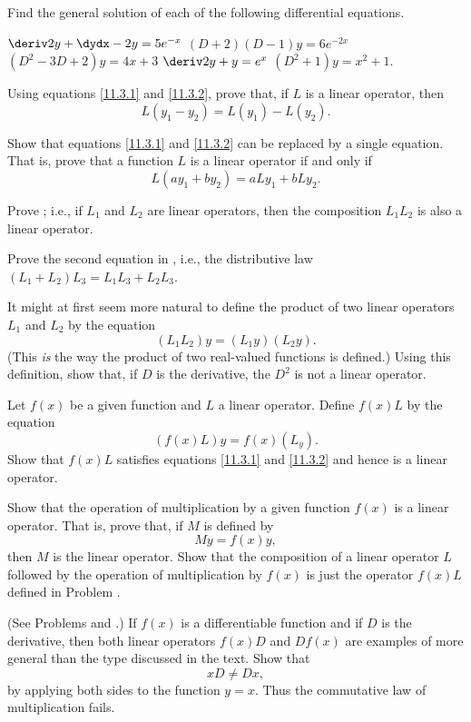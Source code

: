 \begin{exercises}

Find the general solution of each of the following
differential equations.
\begin{exenum}
\x
$\deriv2y + \dydx - 2y = 5{e^{-x}}$
\x
$(D+2)(D-1)y=6e^{-2x}$
\x
$(D^2-3D+2)y = 4x+3$
\x
$\deriv2y + y = e^x$
\x
$(D^2+1)y = x^2+1$.
\end{exenum}

Using equations \eqref{11.3.1} and \eqref{11.3.2},
prove that, if $L$ is a linear operator, then
\[
L(y_1 - y_2) = L(y_1) - L(y_2)
.
\]

Show that equations \eqref{11.3.1} and \eqref{11.3.2}
can be replaced by a single equation.
That is, prove that a function $L$ is a linear
operator if and only if
\[
L(ay_1+by_2) = aLy_1 + bLy_2
.
\]

Prove ; i.e., if $L_1$ and $L_2$
are linear operators, then the composition $L_1L_2$
is also a linear operator.

Prove the second equation in , i.e.,
the distributive law
$(L_1+L_2)L_3 = L_1L_3+L_2L_3$.

It might at first seem more natural to define the product
of two linear operators $L_1$ and $L_2$ by the equation
\[
(L_1L_2)y = (L_1y)(L_2y)
.
\]
(This \emph{is} the way the product of two
real-valued functions is defined.)
Using this definition, show that, if $D$ is the derivative,
the $D^2$ is not a linear operator.

Let $f(x)$ be a given function and $L$ a linear operator.
Define $f(x)L$ by the equation
\[
(f(x)L)y =f(x)(L_y)
.
\]
Show that $f(x)L$ satisfies equations
\eqref{11.3.1} and \eqref{11.3.2} and hence
is a linear operator.

\begin{exenum}
\x
Show that the operation of multiplication by a given
function $f(x)$ is a linear operator.
That is, prove that, if $M$ is defined by
\[
My = f(x)y
,
\]
then $M$ is the linear operator.
\x
Show that the composition of a linear operator $L$
followed by the operation of multiplication by
$f(x)$ is just the operator $f(x)L$ defined in Problem
.
\end{exenum}

(See Problems  and .)
If $f(x)$ is a differentiable function and if $D$
is the derivative, then both linear operators
$f(x)D$ and $Df(x)$ are examples of
 more general
than the type discussed in the text.
Show that
\[
xD \ne Dx
,
\]
by applying both sides to the function $y=x$.
Thus the commutative law of multiplication fails.


\end{exercises}

